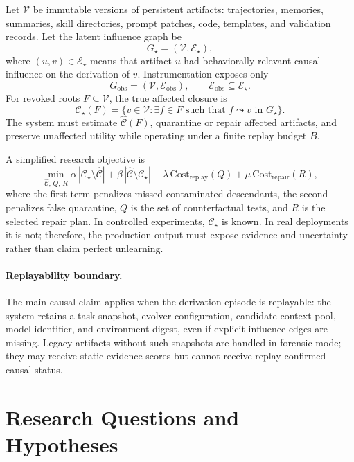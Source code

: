 \documentclass[11pt]{article}
\newcommand{\obs}{G_{\mathrm{obs}}}
\newcommand{\trueg}{G_{\star}}
\newcommand{\closure}{\mathcal{C}}
\newcommand{\artifacts}{\mathcal{V}}
\newcommand{\edges}{\mathcal{E}}
\begin{document}
Let $\artifacts$ be immutable versions of persistent artifacts: trajectories, memories, summaries, skill directories, prompt patches, code, templates, and validation records. Let the latent influence graph be
\[
\trueg=(\artifacts,\edges_{\star}),
\]
where $(u,v)\in\edges_{\star}$ means that artifact $u$ had behaviorally relevant causal influence on the derivation of $v$. Instrumentation exposes only
\[
\obs=(\artifacts,\edges_{\mathrm{obs}}), \qquad \edges_{\mathrm{obs}}\subseteq\edges_{\star}.
\]
For revoked roots $F\subseteq\artifacts$, the true affected closure is
\[
\closure_{\star}(F)=\{v\in\artifacts:\exists f\in F\text{ such that }f\leadsto v\text{ in }\trueg\}.
\]
The system must estimate $\widehat{\closure}(F)$, quarantine or repair affected artifacts, and preserve unaffected utility while operating under a finite replay budget $B$.

A simplified research objective is
\[
\min_{\widehat{\closure},\,Q,\,R}
\alpha\,|\closure_{\star}\setminus\widehat{\closure}|+
\beta\,|\widehat{\closure}\setminus\closure_{\star}|+
\lambda\,\mathrm{Cost}_{\mathrm{replay}}(Q)+
\mu\,\mathrm{Cost}_{\mathrm{repair}}(R),
\]
where the first term penalizes missed contaminated descendants, the second penalizes false quarantine, $Q$ is the set of counterfactual tests, and $R$ is the selected repair plan. In controlled experiments, $\closure_{\star}$ is known. In real deployments it is not; therefore, the production output must expose evidence and uncertainty rather than claim perfect unlearning.

\paragraph{Replayability boundary.}
The main causal claim applies when the derivation episode is replayable: the system retains a task snapshot, evolver configuration, candidate context pool, model identifier, and environment digest, even if explicit influence edges are missing. Legacy artifacts without such snapshots are handled in forensic mode; they may receive static evidence scores but cannot receive replay-confirmed causal status.

\section{Research Questions and Hypotheses}
\end{document}
